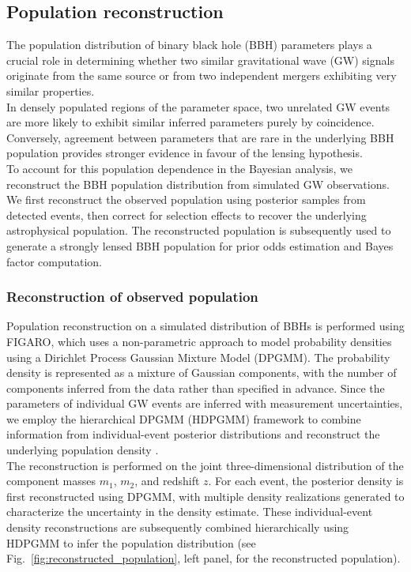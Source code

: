 \documentclass[linenumbers,amsmath,trackchanges]{aastex702}
\begin{document}
\subsection{Population reconstruction}
\label{sec:population_reconstruction}
The population distribution of binary black hole (BBH) parameters plays a crucial role in determining 
whether two similar gravitational wave (GW) signals originate from the same source or from two independent 
mergers exhibiting very similar properties.\\
In densely populated regions of the parameter space, two unrelated GW events are more likely to exhibit 
similar inferred parameters purely by coincidence. Conversely, agreement between parameters that are rare 
in the underlying BBH population provides stronger evidence in favour of the lensing hypothesis.\\
To account for this population dependence in the Bayesian analysis, we reconstruct the BBH population 
distribution from simulated GW observations. We first reconstruct the observed population using posterior 
samples from detected events, then correct for selection effects to recover the underlying astrophysical 
population. The reconstructed population is subsequently used to generate a strongly lensed BBH population 
for prior odds estimation and Bayes factor computation.

\subsubsection{Reconstruction of observed population}
Population reconstruction on a simulated distribution of BBHs is performed using FIGARO, which uses a 
non-parametric approach to model probability densities using a Dirichlet Process Gaussian Mixture Model 
(DPGMM). The probability density is represented as a mixture of Gaussian components, with the number of 
components inferred from the data rather than specified in advance. Since the parameters of individual 
GW events are inferred with measurement uncertainties, we employ the hierarchical DPGMM (HDPGMM) framework 
to combine information from individual-event posterior distributions and reconstruct the underlying 
population density \cite{29}.\\
The reconstruction is performed on the joint three-dimensional distribution of the component masses $m_1$, 
$m_2$, and redshift $z$. For each event, the posterior density is first reconstructed using DPGMM, with 
multiple density realizations generated to characterize the uncertainty in the density estimate. These 
individual-event density reconstructions are subsequently combined hierarchically using HDPGMM to infer 
the population distribution
(see Fig.~\ref{fig:reconstructed_population}, left panel, for the reconstructed population). 
\end{document}
